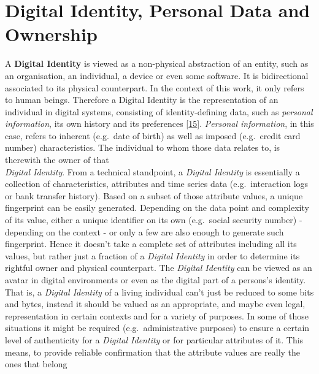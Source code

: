 \documentclass[12pt,english,a4paper,titlepage,cleardoublepage=empty,dottedtoc]{report}
\begin{document}
\hypertarget{digital-identity-personal-data-and-ownership}{\section{Digital
Identity, Personal Data and
Ownership}\label{digital-identity-personal-data-and-ownership}}

A \textbf{\protect\hypertarget{def--digital-identity}{}{Digital
Identity}} is viewed as a non-physical abstraction of an entity, such as
an organisation, an individual, a device or even some software. It is
bidirectional associated to its physical counterpart. In the context of
this work, it only refers to human beings. Therefore a Digital Identity
is the representation of an individual in digital systems, consisting of
identity-defining data, such as \emph{personal information}, its own
history and its preferences
{[}\protect\hyperlink{ref-whitepaper_2012_the-value-of-our-digital-identity_definition}{15}{]}.
\emph{Personal information}, in this case, refers to inherent (e.g.~date
of birth) as well as imposed (e.g.~credit card number) characteristics.
The individual to whom those data relates to, is therewith the owner of
that\\
\emph{Digital Identity}. From a technical standpoint, a \emph{Digital
Identity} is essentially a collection of characteristics, attributes and
time series data (e.g.~interaction logs or bank transfer history). Based
on a subset of those attribute values, a unique fingerprint can be
easily generated. Depending on the data point and complexity of its
value, either a unique identifier on its own (e.g.~social security
number) - depending on the context - or only a few are also enough to
generate such fingerprint. Hence it doesn't take a complete set of
attributes including all its values, but rather just a fraction of a
\emph{Digital Identity} in order to determine its rightful owner and
physical counterpart. The \emph{Digital Identity} can be viewed as an
avatar in digital environments or even as the digital part of a
persons's identity. That is, a \emph{Digital Identity} of a living
individual can't just be reduced to some bits and bytes, instead it
should be valued as an appropriate, and maybe even legal, representation
in certain contexts and for a variety of purposes. In some of those
situations it might be required (e.g.~administrative purposes) to ensure
a certain level of authenticity for a \emph{Digital Identity} or for
particular attributes of it. This means, to provide reliable
confirmation that the attribute values are really the ones that belong
\end{document}
